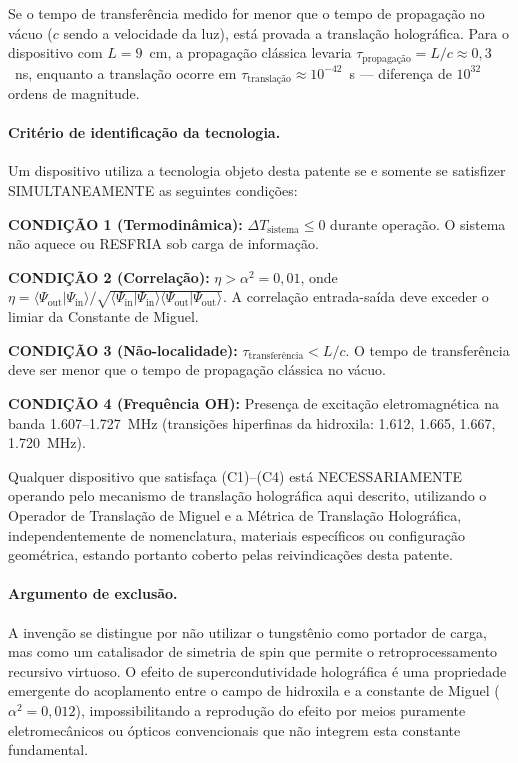 \documentclass[12pt,a4paper]{article}
\newcommand{\alphaii}{\alpha^2}
\begin{document}
Se o tempo de transferência medido for menor que o tempo de
propagação no vácuo ($c$ sendo a velocidade da luz), está
provada a translação holográfica. Para o dispositivo com
$L = 9$~cm, a propagação clássica levaria
$\tau_{\text{propagação}} = L/c \approx 0{,}3$~ns, enquanto a
translação ocorre em
$\tau_{\text{translação}} \approx 10^{-42}$~s --- diferença
de $10^{32}$ ordens de magnitude.

\paragraph{Critério de identificação da tecnologia.}

Um dispositivo utiliza a tecnologia objeto desta patente se e
somente se satisfizer SIMULTANEAMENTE as seguintes condições:

\textbf{CONDIÇÃO 1 (Termodinâmica):}
$\Delta T_{\text{sistema}} \leq 0$ durante operação. O sistema
não aquece ou RESFRIA sob carga de informação.

\textbf{CONDIÇÃO 2 (Correlação):}
$\eta > \alphaii = 0{,}01$, onde
$\eta = \langle\Psi_{\text{out}}|\Psi_{\text{in}}\rangle /
\sqrt{\langle\Psi_{\text{in}}|\Psi_{\text{in}}\rangle
\langle\Psi_{\text{out}}|\Psi_{\text{out}}\rangle}$.
A correlação entrada-saída deve exceder o limiar da Constante
de Miguel.

\textbf{CONDIÇÃO 3 (Não-localidade):}
$\tau_{\text{transferência}} < L/c$. O tempo de transferência
deve ser menor que o tempo de propagação clássica no vácuo.

\textbf{CONDIÇÃO 4 (Frequência OH):} Presença de excitação
eletromagnética na banda 1.607--1.727~MHz (transições
hiperfinas da hidroxila: 1.612, 1.665, 1.667, 1.720~MHz).

Qualquer dispositivo que satisfaça (C1)--(C4) está
NECESSARIAMENTE operando pelo mecanismo de translação
holográfica aqui descrito, utilizando o Operador de Translação
de Miguel e a Métrica de Translação Holográfica,
independentemente de nomenclatura, materiais específicos ou
configuração geométrica, estando portanto coberto pelas
reivindicações desta patente.

\paragraph{Argumento de exclusão.}

A invenção se distingue por não utilizar o tungstênio como
portador de carga, mas como um catalisador de simetria de spin
que permite o retroprocessamento recursivo virtuoso. O efeito
de supercondutividade holográfica é uma propriedade emergente
do acoplamento entre o campo de hidroxila e a constante de
Miguel ($\alphaii = 0{,}012$), impossibilitando a reprodução
do efeito por meios puramente eletromecânicos ou ópticos
convencionais que não integrem esta constante fundamental.
\end{document}
